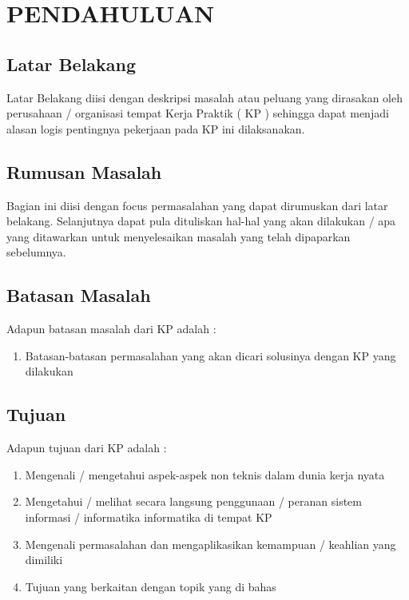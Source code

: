 \documentclass[oneside,listof=totoc]{scrbook}
\begin{document}
\tableofcontents
\listoftables
\listoffigures

\mainmatter
\pagestyle{fancy}\fancyhf{}\fancyhead[R]{\thepage}
\renewcommand{\headrulewidth}{0pt}

\chapter{PENDAHULUAN}

\vspace{0.5cm}

\section{Latar Belakang}
\indent Latar Belakang diisi dengan deskripsi masalah atau peluang yang dirasakan oleh perusahaan / organisasi tempat Kerja Praktik ( KP ) sehingga dapat menjadi alasan logis pentingnya pekerjaan pada KP ini dilaksanakan.

\section{Rumusan Masalah}
Bagian ini diisi dengan focus permasalahan yang dapat dirumuskan dari latar belakang. Selanjutnya dapat pula dituliskan hal-hal yang akan dilakukan / apa yang ditawarkan untuk menyelesaikan masalah yang telah dipaparkan sebelumnya.

\section{Batasan Masalah}
Adapun batasan masalah dari KP adalah :
\begin{enumerate}[label=\alph*.]
  \item Batasan-batasan permasalahan yang akan dicari solusinya dengan KP yang dilakukan
\end{enumerate}

\section{Tujuan}
Adapun tujuan dari KP adalah :
\begin{enumerate}[label=\alph*.]
  \item Mengenali / mengetahui aspek-aspek non teknis dalam dunia kerja nyata
  \item Mengetahui / melihat secara langsung penggunaan / peranan sistem informasi / informatika informatika di tempat KP
  \item Mengenali permasalahan dan mengaplikasikan kemampuan / keahlian yang dimiliki
  \item Tujuan yang berkaitan dengan topik yang di bahas
\end{enumerate}
\end{document}
